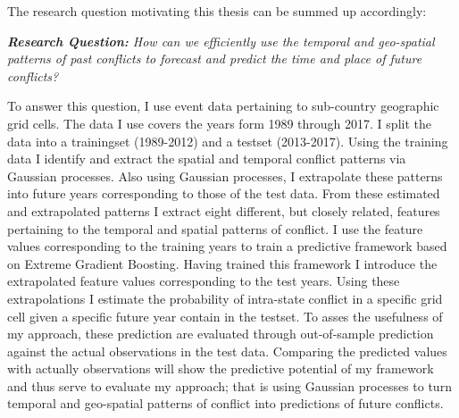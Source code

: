 \documentclass[a4paper]{article}
\begin{document}
The research question motivating this thesis can be summed up accordingly:\par

\begin{displayquote}

\emph{\textbf{Research Question:} How can we efficiently use the temporal and geo-spatial patterns of past conflicts to forecast and predict the time and place of future conflicts?}\par

\end{displayquote}


To answer this question, I use event data pertaining to sub-country geographic grid cells. The data I use covers the years form 1989 through 2017. I split the data into a trainingset (1989-2012) and a testset (2013-2017). Using the training data I identify and extract the spatial and temporal conflict patterns via Gaussian processes. Also using Gaussian processes, I extrapolate these patterns into future years corresponding to those of the test data. From these estimated and extrapolated patterns I extract eight different, but closely related, features pertaining to the temporal and spatial patterns of conflict. I use the feature values corresponding to the training years to train a predictive framework based on Extreme Gradient Boosting. Having trained this framework I introduce the extrapolated feature values corresponding to the test years. Using these extrapolations I estimate the probability of intra-state conflict in a specific grid cell given a specific future year contain in the testset. To asses the usefulness of my approach, these prediction are evaluated through out-of-sample prediction against the actual observations in the test data. Comparing the predicted values with actually observations will show the predictive potential of my framework and thus serve to evaluate my approach; that is using Gaussian processes to turn temporal and geo-spatial patterns of conflict into predictions of future conflicts.\par
\end{document}
